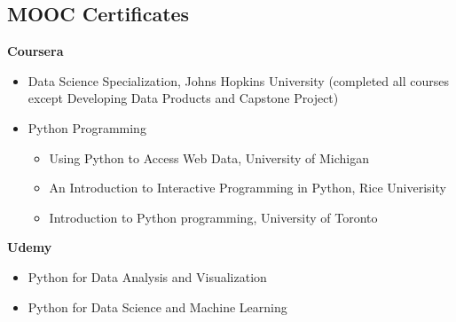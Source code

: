 \documentclass[]{res}
\begin{document}
\begin{resume}
\section{MOOC Certificates}
{\bf Coursera}
 \begin{itemize} \itemsep -2pt
 \item Data Science Specialization, Johns Hopkins University (completed all courses except Developing Data Products and Capstone Project)
 \item Python Programming
 \begin{itemize}\itemsep -2pt
 	\item Using Python to Access Web Data, University of Michigan
 	\item An Introduction to Interactive Programming in Python, Rice Univerisity
 	\item Introduction to Python programming, University of Toronto
 \end{itemize}
 \end{itemize}
  \vspace{-0.3cm} 
 {\bf Udemy}
 \begin{itemize}
 	\item Python for Data Analysis and Visualization
 	\item Python for Data Science and Machine Learning
 \end{itemize}


%    
%    


\end{resume}
\end{document}
